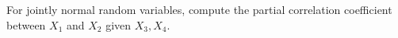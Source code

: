 For jointly normal random variables, compute the partial correlation coefficient between $X_1$ and $X_2$ given $X_3, X_4$.
